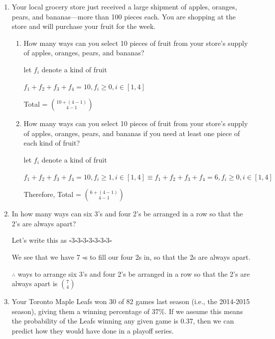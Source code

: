 \documentclass{article}
\begin{document}
\vspace{0.5cm}
\rhead{\leftmark}
\cfoot{}

\text{}

\begin{enumerate}


\item Your local grocery store just received a large shipment of apples, oranges, pears, and bananas—more than
100 pieces each. You are shopping at the store and will purchase your fruit for the week.

\begin{enumerate}
  \item How many ways can you select 10 pieces of fruit from your store’s supply of apples, oranges, pears,
and bananas?

let $f_i$ denote a kind of fruit

$f_1 + f_2 + f_3 + f_4 = 10, f_i \geq 0, i \in [1,4]$

Total = $\displaystyle{{10 + (4 - 1)}\choose{4 - 1}}$

\item How many ways can you select 10 pieces of fruit from your store’s supply of apples, oranges, pears,
and bananas if you need at least one piece of each kind of fruit?

let $f_i$ denote a kind of fruit

$\displaystyle f_1 + f_2 + f_3 + f_4 = 10, f_i \geq 1, i \in [1,4] \equiv f_1 + f_2 + f_3 + f_4 = 6, f_i \geq 0, i \in [1,4]$

Therefore, Total = $\displaystyle{{6 + (4 - 1)}\choose{4 - 1}}$

\end{enumerate}

\item In how many ways can six 3’s and four 2’s be arranged in a row so that the 2’s are always apart?

Let's write this as $\square 3 \square 3 \square 3 \square 3 \square 3 \square 3 \square 3 \square$

We see that we have 7 $\square$s to fill our four 2s in, so that the 2s are always apart.

$\therefore$ ways to arrange six 3’s and four 2’s be arranged in a row so that the 2’s are always apart is $\displaystyle{{7}\choose{4}}$



\item Your Toronto Maple Leafs won 30 of 82 games last season (i.e., the 2014-2015 season), giving them a
winning percentage of 37\%. If we assume this means the probability of the Leafs winning any given game
is 0.37, then we can predict how they would have done in a playoff series.



\end{enumerate}
\end{document}
